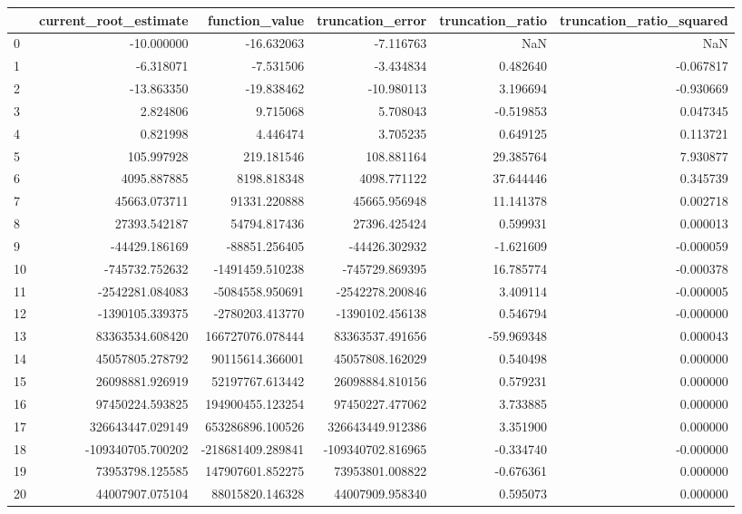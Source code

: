 \begin{tabular}{lrrrrr}
\toprule
 & current_root_estimate & function_value & truncation_error & truncation_ratio & truncation_ratio_squared \\
\midrule
0 & -10.000000 & -16.632063 & -7.116763 & NaN & NaN \\
1 & -6.318071 & -7.531506 & -3.434834 & 0.482640 & -0.067817 \\
2 & -13.863350 & -19.838462 & -10.980113 & 3.196694 & -0.930669 \\
3 & 2.824806 & 9.715068 & 5.708043 & -0.519853 & 0.047345 \\
4 & 0.821998 & 4.446474 & 3.705235 & 0.649125 & 0.113721 \\
5 & 105.997928 & 219.181546 & 108.881164 & 29.385764 & 7.930877 \\
6 & 4095.887885 & 8198.818348 & 4098.771122 & 37.644446 & 0.345739 \\
7 & 45663.073711 & 91331.220888 & 45665.956948 & 11.141378 & 0.002718 \\
8 & 27393.542187 & 54794.817436 & 27396.425424 & 0.599931 & 0.000013 \\
9 & -44429.186169 & -88851.256405 & -44426.302932 & -1.621609 & -0.000059 \\
10 & -745732.752632 & -1491459.510238 & -745729.869395 & 16.785774 & -0.000378 \\
11 & -2542281.084083 & -5084558.950691 & -2542278.200846 & 3.409114 & -0.000005 \\
12 & -1390105.339375 & -2780203.413770 & -1390102.456138 & 0.546794 & -0.000000 \\
13 & 83363534.608420 & 166727076.078444 & 83363537.491656 & -59.969348 & 0.000043 \\
14 & 45057805.278792 & 90115614.366001 & 45057808.162029 & 0.540498 & 0.000000 \\
15 & 26098881.926919 & 52197767.613442 & 26098884.810156 & 0.579231 & 0.000000 \\
16 & 97450224.593825 & 194900455.123254 & 97450227.477062 & 3.733885 & 0.000000 \\
17 & 326643447.029149 & 653286896.100526 & 326643449.912386 & 3.351900 & 0.000000 \\
18 & -109340705.700202 & -218681409.289841 & -109340702.816965 & -0.334740 & -0.000000 \\
19 & 73953798.125585 & 147907601.852275 & 73953801.008822 & -0.676361 & 0.000000 \\
20 & 44007907.075104 & 88015820.146328 & 44007909.958340 & 0.595073 & 0.000000 \\

\end{tabular}
